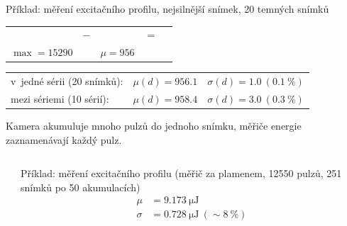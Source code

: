 \documentclass[10pt]{beamer}
\begin{document}
\begin{frame}
	Příklad: měření excitačního profilu, nejsilnější snímek,
	20 temných snímků
	\begin{center}
% 			
% 			
% 			
		\setlength{\tabcolsep}{2pt}
		\begin{tabular}{ccccc}
			 &
			\parbox[b][2.7cm][c]{0.9em}{$-$} &
			 &
			\parbox[b][2.7cm][c]{0.9em}{$=$} &
			 \\
			$\max = 15290$ & &
			$\mu = 956$ & &
		\end{tabular}
	\end{center}
	\begin{tabular}{l l l}
		v~jedné sérii (20 snímků): & $\mu(d) = \num{956.1}$
			& $\sigma(d) = \num{1.0}\ (\SI{0.1}{\percent})$ \\
		mezi sériemi (10 sérií): & $\mu(d) = \num{958.4}$
			& $\sigma(d) = \num{3.0}\ (\SI{0.3}{\percent})$
	\end{tabular}
\end{frame}

\begin{frame}
	Kamera akumuluje mnoho pulzů do jednoho snímku,
	měřiče energie zaznamenávají každý pulz.
	\medskip
	\begin{columns}
	\begin{column}{0.5\textwidth}
		
	\end{column}
	\begin{column}{0.5\textwidth}
		Příklad: měření excitačního profilu
		(měřič za plamenem,
		12550 pulzů, 251 snímků po 50 akumulacích)
		\begin{align*}
			\mu    &= \SI{9.173}{\micro\joule} \\
			\sigma &= \SI{0.728}{\micro\joule} \ (\sim \SI{8}\percent)
		\end{align*}
	\end{column}
	\end{columns}
\end{frame}
\end{document}
